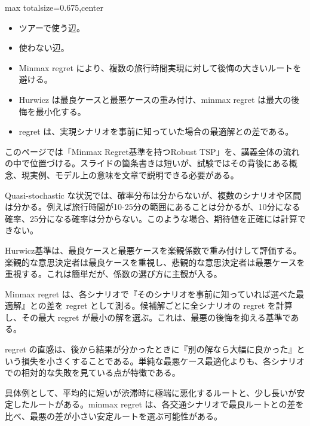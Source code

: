 \clearpage
{}
\begin{adjustbox}{max totalsize={\textwidth}{0.675\textheight},center}
\begin{minipage}{\textwidth}\scriptsize
\begin{minipage}[t]{0.485\textwidth}
\begin{itemize}
\item ツアーで使う辺。
\item 使わない辺。
\item Minmax regret により、複数の旅行時間実現に対して後悔の大きいルートを避ける。
\end{itemize}
\begin{itemize}
\item Hurwicz は最良ケースと最悪ケースの重み付け、minmax regret は最大の後悔を最小化する。
\item regret は、実現シナリオを事前に知っていた場合の最適解との差である。
\end{itemize}
\end{minipage}\hfill
\begin{minipage}[t]{0.485\textwidth}
このページでは「Minmax Regret基準を持つRobust TSP」を、講義全体の流れの中で位置づける。スライドの箇条書きは短いが、試験ではその背後にある概念、現実例、モデル上の意味を文章で説明できる必要がある。\par
Quasi-stochastic な状況では、確率分布は分からないが、複数のシナリオや区間は分かる。例えば旅行時間が10-25分の範囲にあることは分かるが、10分になる確率、25分になる確率は分からない。このような場合、期待値を正確には計算できない。\par
Hurwicz基準は、最良ケースと最悪ケースを楽観係数で重み付けして評価する。楽観的な意思決定者は最良ケースを重視し、悲観的な意思決定者は最悪ケースを重視する。これは簡単だが、係数の選び方に主観が入る。\par
Minmax regret は、各シナリオで『そのシナリオを事前に知っていれば選べた最適解』との差を regret として測る。候補解ごとに全シナリオの regret を計算し、その最大 regret が最小の解を選ぶ。これは、最悪の後悔を抑える基準である。\par
regret の直感は、後から結果が分かったときに『別の解なら大幅に良かった』という損失を小さくすることである。単純な最悪ケース最適化よりも、各シナリオでの相対的な失敗を見ている点が特徴である。\par
具体例として、平均的に短いが渋滞時に極端に悪化するルートと、少し長いが安定したルートがある。minmax regret は、各交通シナリオで最良ルートとの差を比べ、最悪の差が小さい安定ルートを選ぶ可能性がある。\par

\end{minipage}
\end{minipage}
\end{adjustbox}
